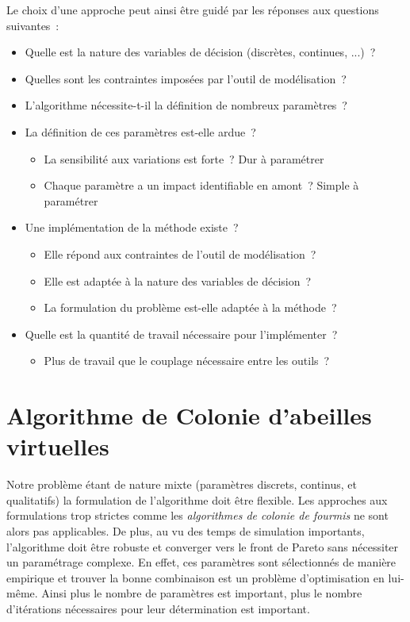 {
\noindent
Le choix d’une approche peut ainsi être guidé par les réponses aux questions
suivantes~:
\begin{itemize}
  \item Quelle est la nature des variables de décision (discrètes, continues, ...)~?
  \item Quelles sont les contraintes imposées par l’outil de modélisation~?
  \item L’algorithme nécessite-t-il la définition de nombreux paramètres~?
  \item La définition de ces paramètres est-elle ardue~?
    \begin{itemize}
      \item La sensibilité aux variations est forte~? Dur à paramétrer
      \item Chaque paramètre a un impact identifiable en amont~? Simple à paramétrer
    \end{itemize}
  \item Une implémentation de la méthode existe~?
    \begin{itemize}
      \item Elle répond aux contraintes de l’outil de modélisation~?
      \item Elle est adaptée à la nature des variables de décision~?
      \item La formulation du problème est-elle adaptée à la méthode~?
    \end{itemize}
  \item Quelle est la quantité de travail nécessaire pour l’implémenter~?
    \begin{itemize}
      \item Plus de travail que le couplage nécessaire entre les outils~?
    \end{itemize}
\end{itemize}
}




\section{Algorithme de Colonie d’abeilles virtuelles} %
\label{sec:algorithme_de_colonie_d_abeilles_virtuelles}
Notre problème étant de nature mixte (paramètres discrets, continus, et
qualitatifs) la formulation de l’algorithme doit être flexible. Les approches
aux formulations trop strictes comme les \textit{algorithmes de colonie de
fourmis} ne sont alors pas applicables. De plus, au vu des temps de simulation
importants, l’algorithme doit être robuste et converger vers le front de Pareto
sans nécessiter un paramétrage complexe. En effet, ces paramètres sont
sélectionnés de manière empirique et trouver la bonne combinaison est un
problème d’optimisation en lui-même. Ainsi plus le nombre de paramètres est important,
plus le nombre d’itérations nécessaires pour leur détermination est important.

